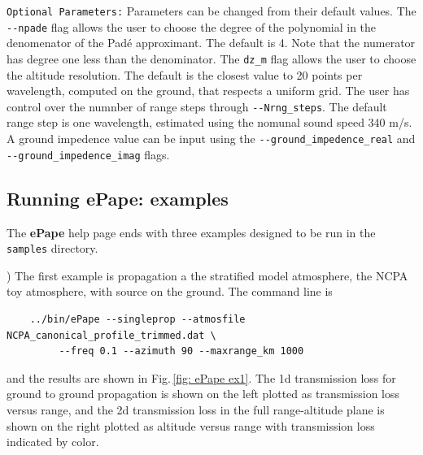 \verb+Optional Parameters:+ Parameters can be changed from their default values. The \verb+--npade+ flag allows the user to choose the degree of the polynomial in the denomenator of the Pad\'e approximant. The default is 4. Note that the numerator has degree one less than the denominator. The \verb+dz_m+ flag allows the user to choose the altitude resolution. The default is the closest value to 20 points per wavelength, computed on the ground, that respects a uniform grid. The user has control over the numnber of range steps through \verb+--Nrng_steps+. The default range step is one wavelength, estimated using the nomunal sound speed 340 m/s. A ground impedence value can be input using the \verb+--ground_impedence_real+ and \verb+--ground_impedence_imag+ flags. 


\subsection{Running ePape: examples}
\label{sec: pade examples}

The {\bf ePape} help page ends with three examples designed to be run in the \verb+samples+ directory. 

) The first example is propagation a the stratified model atmosphere, the NCPA toy atmosphere, with source on the ground. The command line is 
\begin{verbatim}
    ../bin/ePape --singleprop --atmosfile NCPA_canonical_profile_trimmed.dat \
         --freq 0.1 --azimuth 90 --maxrange_km 1000
\end{verbatim}
and the results are shown in Fig.\,\ref{fig: ePape ex1}. The 1d transmission loss for ground to ground propagation is shown on the left plotted as transmission loss versus range, and the 2d transmission loss in the full range-altitude plane is shown on the right plotted as altitude versus range with transmission loss indicated by color. 

